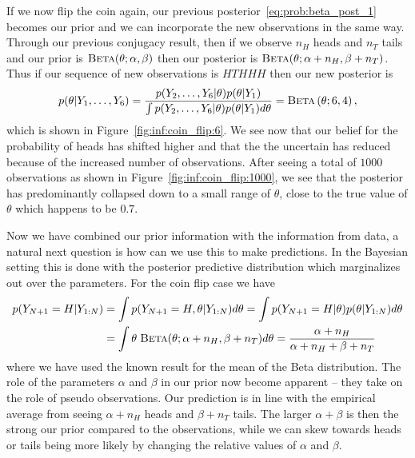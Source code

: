 If we now flip the coin again, our previous posterior~\eqref{eq:prob:beta_post_1} becomes our
prior and we can incorporate the new observations in the same way.  
Through our previous conjugacy result, then if we observe $n_{H}$ heads
and $n_{T}$ tails and our prior is $\textsc{Beta}(\theta ; \alpha, \beta)$ then our posterior is
$\textsc{Beta}(\theta ; \alpha+n_H, \beta+n_T)$.
Thus if our sequence of new
observations is $HTHHH$ then our new posterior is
\begin{align}
p(\theta | Y_1,\dots,Y_6) = \frac{p(Y_2,\dots,Y_6 | \theta)p(\theta | Y_1)}
{\int p(Y_2,\dots,Y_6 | \theta)p(\theta | Y_1) d\theta} = \textsc{Beta}\left(\theta ; 6,4\right),
\end{align}
which is shown in Figure~\ref{fig:inf:coin_flip:6}.  We see now that our belief for the probability of heads
has shifted higher and that the the uncertain has reduced because of the increased number
of observations.
After seeing a total of $1000$ observations as shown in Figure~\ref{fig:inf:coin_flip:1000}, we
see that the posterior has predominantly collapsed down to a small range of $\theta$,
close to the true value of $\theta$ which happens to be $0.7$.

Now we have combined  our prior information with the information from data, a natural
next question is how can we use this to make predictions.  In the Bayesian setting
this is done with the posterior predictive distribution which marginalizes out over
the parameters.  For the coin flip case we have
\begin{align}
\label{eq:bayes:post-pred}
p( Y_{N+1}=H | Y_{1:N}) &= \int p(Y_{N+1}=H, \theta | Y_{1:N}) d\theta
= \int p(Y_{N+1}=H | \theta) p(\theta | Y_{1:N})  d\theta \nonumber \\
&= \int  \theta \; \textsc{Beta}(\theta ; \alpha+n_H, \beta+n_T) d\theta 
=\frac{\alpha+n_H}{\alpha+n_H+\beta+n_T}
\end{align}
where we have used the known result for the mean of the Beta distribution.
The role of the parameters $\alpha$ and $\beta$ in our prior now become apparent
-- they take on the role of pseudo observations.  Our prediction is in line with the
empirical average from seeing $\alpha+n_H$ heads and $\beta+n_T$ tails.  The larger
$\alpha+\beta$ is then the strong our prior compared to the observations, while we
can skew towards heads or tails being more likely by changing the relative values of $\alpha$
and $\beta$.

